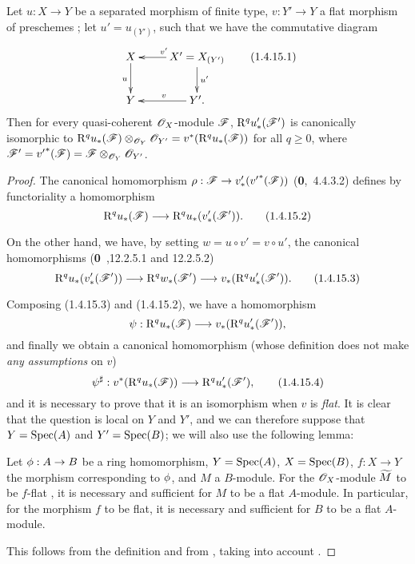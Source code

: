 \begin{prop}[1.4.15]
\label{3.1.4.15}
Let $u:X\to Y$ be a separated morphism of finite type, $v:Y'\to Y$ a flat morphism of preschemes ; let $u'=u_{(Y')}$, such that we have the commutative diagram
\[
  \xymatrix{
    X\ar[d]_u &
    X'=X_{(Y')}\ar[l]_{v'}\ar[d]^{u'}\\
    Y &
    Y'\ar[l]_{v}.
  }
  \tag{1.4.15.1}
\]
Then for every quasi-coherent $\mathscr{O}_X$-module $\mathscr{F}$, $\mathrm{R}^q u_*'(\mathscr{F}')$ is canonically isomorphic to $\mathrm{R}^q u_*(\mathscr{F})\otimes_{\mathscr{O}_Y}\mathscr{O}_{Y'}=v^*(\mathrm{R}^q u_*(\mathscr{F}))$ for all $q\geq 0$, where $\mathscr{F}'={v'}^*(\mathscr{F})=\mathscr{F}\otimes_{\mathscr{O}_Y}\mathscr{O}_{Y'}$.
\end{prop}

\begin{proof}
\label{proof-3.1.4.15}
The canonical homomorphism $\rho:\sh{F}\to v_*'({v'}^*(\sh{F}))$ (\textbf{0},~4.4.3.2) defines by functoriality a homomorphism
\[
  \RR^q u_*(\sh{F})\to\RR^q u_*(v_*'(\sh{F}')).
  \tag{1.4.15.2}
\]

On the other hand, we have, by setting $w=u\circ v'=v\circ u'$, the canonical homomorphisms (\textbf{0}~,12.2.5.1 and 12.2.5.2)
\[
  \RR^q u_*(v_*'(\sh{F}'))\to\RR^q w_*(\sh{F}')\to v_*(\RR^q u_*'(\sh{F}')).
  \tag{1.4.15.3}
\]

Composing (1.4.15.3) and (1.4.15.2), we have a homomorphism
\[
  \psi:\RR^q u_*(\sh{F})\to v_*(\RR^q u_*'(\sh{F}')),
\]
and finally we obtain a canonical homomorphism (whose definition does not make \emph{any assumptions} on $v$)
\[
  \psi^\sharp:v^*(\RR^q u_*(\sh{F}))\to\RR^q u_*'(\sh{F}'),
  \tag{1.4.15.4}
\]
and it is necessary to prove that it is an isomorphism when $v$ is \emph{flat}.
It is clear that the question is local on $Y$ and $Y'$, and we can therefore suppose that $Y={\mathop{\mathrm{Spec}}\nolimits}(A)$ and $Y'={\mathop{\mathrm{Spec}}\nolimits}(B)$; we will also use the following lemma:
\begin{lem}
\label{3.1.4.15.5}
Let $\vphi:A\to B$ be a ring homomorphism, $Y={\mathop{\mathrm{Spec}}\nolimits}(A)$, $X={\mathop{\mathrm{Spec}}\nolimits}(B)$, $f:X\to Y$ the morphism corresponding to $\phi$, and $M$ a $B$-module.
For the $\mathscr{O}_X$-module ${\widetilde{M}}$ to be $f$-flat , it is necessary and sufficient for $M$ to be a flat $A$-module.
In particular, for the morphism $f$ to be flat, it is necessary and sufficient for $B$ to be a flat $A$-module.
\end{lem}

This follows from the definition  and from , taking into account .


\end{proof}
